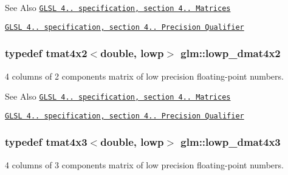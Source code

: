 \begin{DoxySeeAlso}{See Also}
\href{http://www.opengl.org/registry/doc/GLSLangSpec.4.20.8.pdf}{\tt G\-L\-S\-L 4.. specification, section 4.. Matrices} 

\href{http://www.opengl.org/registry/doc/GLSLangSpec.4.20.8.pdf}{\tt G\-L\-S\-L 4.. specification, section 4.. Precision Qualifier} 
\end{DoxySeeAlso}
\hypertarget{group__core__precision_gaeee03c38861981ecb29f3f71644bf3ac}{
\subsubsection[{lowp\-\_\-dmat4x2}]{\setlength{\rightskip}{0pt plus 5cm}typedef tmat4x2$<$double, lowp$>$ {\bf glm\-::lowp\-\_\-dmat4x2}}}\label{group__core__precision_gaeee03c38861981ecb29f3f71644bf3ac}
4 columns of 2 components matrix of low precision floating-\/point numbers.

\begin{DoxySeeAlso}{See Also}
\href{http://www.opengl.org/registry/doc/GLSLangSpec.4.20.8.pdf}{\tt G\-L\-S\-L 4.. specification, section 4.. Matrices} 

\href{http://www.opengl.org/registry/doc/GLSLangSpec.4.20.8.pdf}{\tt G\-L\-S\-L 4.. specification, section 4.. Precision Qualifier} 
\end{DoxySeeAlso}
\hypertarget{group__core__precision_gac445c564f0c68d3520eca97ea755e618}{
\subsubsection[{lowp\-\_\-dmat4x3}]{\setlength{\rightskip}{0pt plus 5cm}typedef tmat4x3$<$double, lowp$>$ {\bf glm\-::lowp\-\_\-dmat4x3}}}\label{group__core__precision_gac445c564f0c68d3520eca97ea755e618}
4 columns of 3 components matrix of low precision floating-\/point numbers.

